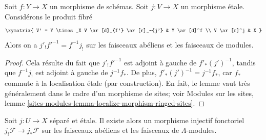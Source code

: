 \begin{lemma}
\label{lemma-shriek-base-change}
Soit $f: Y \to X$ un morphisme de schémas. Soit $j: V \to X$ un morphisme
étale. Considérons le produit fibré
$$
\xymatrix{
V' = Y \times_X V \ar[d]_{f'} \ar[r]_-{j'} & Y \ar[d]^f \\
V \ar[r]^j & X
}
$$
Alors on a $j'_! f'^{-1} = f^{-1} j_!$ sur les faisceaux abéliens et les
faisceaux de modules.
\end{lemma}

\begin{proof}
Cela résulte du fait que $j'_! f'^{-1}$ est adjoint à gauche de
$f'_* (j')^{-1}$, tandis que $f^{-1} j_!$ est adjoint à gauche de $j^{-1}f_*$.
De plus, $f'_* (j')^{-1} = j^{-1}f_*$, car $f_*$ commute à la
localisation étale (par construction). En fait, le lemme vaut très généralement
dans le cadre d'un morphisme de sites; voir
Modules sur les sites, lemme
\ref{sites-modules-lemma-localize-morphism-ringed-sites}.
\end{proof}

\begin{lemma}
\label{lemma-shriek-into-star-separated-etale}
Soit $j : U \to X$ séparé et étale. Il existe alors un morphisme
injectif fonctoriel $j_!\mathcal{F} \to j_*\mathcal{F}$
sur les faisceaux abéliens et les faisceaux de $\Lambda$-modules.
\end{lemma}

